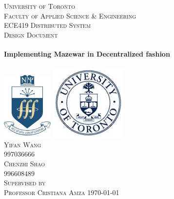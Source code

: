 \begin{titlepage}
\begin{center}

\textsc{\LARGE University of Toronto}
\\[1.5cm]
\textsc{\large Faculty of Applied Science \& Engineering}
\\[0.5cm]
\textsc{\large ECE419 Distributed System}
\\[1.5cm]
\textsc{\Large Design Document}
\\[1.5cm]
\HRule
\\[0.5cm]
{ \huge \bfseries Implementing Mazewar in Decentralized fashion}
\\[0.3cm]
\HRule
\\[1.0cm]

\includegraphics[width=1.0in]{./Logos/nscilogo}
\hspace{2cm}
\includegraphics[width=1.5in]{./Logos/utorontologo}
\\[1.0cm]

\textsc{\large Yifan Wang}
\\[0.25cm]
\textsc{\normalsize 997036666}
\\[0.25cm]
\textsc{\large Chenzhi Shao}
\\[0.25cm]
\textsc{\normalsize 996608489}
\\[1.0cm]
\textsc{Supervised by}
\\[0.25cm]
\textsc{\large Professor Cristiana Amza}
\vfill
{\large \today}

\end{center}
\end{titlepage} 
